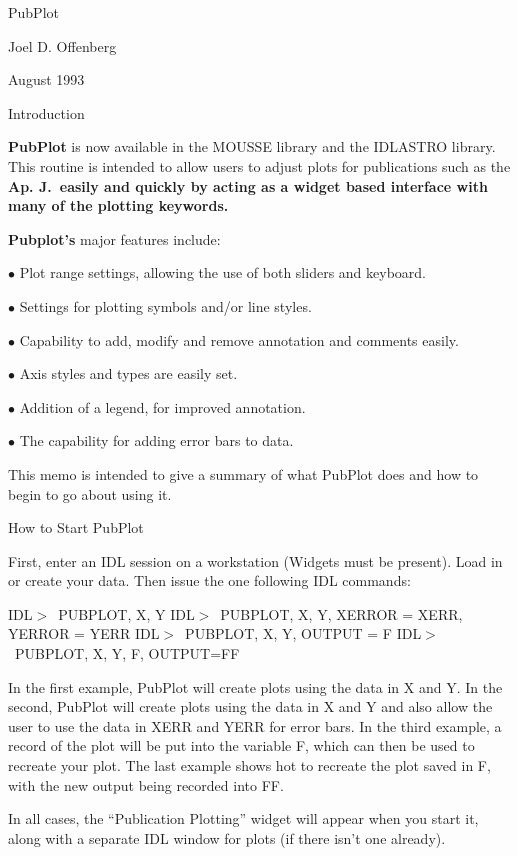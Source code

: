 \rm
\def\apj {\underbar\bf Ap. J.}
\def\idl {\hfill\break IDL$>$}
\def\pubplot {\bf PubPlot \rm}

\centerline {\bflarge PubPlot}
\vskip 2mm \centerline {\rmtwelve Joel D. Offenberg}
\vskip 2mm \centerline { August 1993}

\vskip 5mm \centerline {\rmtwelve Introduction}


{\bf PubPlot} is now available in the MOUSSE library and the IDLASTRO library. 
This 
routine is intended to allow users to adjust plots for publications such as
the \apj\ easily
and quickly by acting as a widget based interface with many of the plotting
keywords.  

{\bf Pubplot's} major features include:
\item{$\bullet$} Plot range settings, allowing the use of both sliders
	and keyboard.
\item{$\bullet$} Settings for plotting symbols and/or line styles.
\item{$\bullet$} Capability to add, modify and remove annotation and comments
	easily.
\item{$\bullet$} Axis styles and types are easily set.
\item{$\bullet$} Addition of a legend, for improved annotation.
\item{$\bullet$} The capability for adding error bars to data.

This memo is intended to give a summary of what PubPlot does and how to 
begin to go about using it.  

\vskip 3mm \centerline{\rmtwelve How to Start \bftwelve PubPlot}
First, enter an IDL session on a workstation (Widgets must be 
present).  Load in 
or create your data.  Then issue the one following IDL commands:

\idl\ PUBPLOT, X, Y	
\idl\ PUBPLOT, X, Y, XERROR = XERR, YERROR = YERR 
\idl\ PUBPLOT, X, Y, OUTPUT = F	
\idl\ PUBPLOT, X, Y, F, OUTPUT=FF	

In the first example, PubPlot will create plots using the data in X and Y.  In
the second, PubPlot will create plots using the data in X and Y and also allow
the user to use the data in XERR and YERR for error bars.  In the third 
example, a record of the plot will be put into the variable F, which can then
be used to recreate your plot.  The last example shows hot to recreate the 
plot saved in F, with the new output being recorded into FF.

In all cases, the ``Publication Plotting'' widget will appear when you start it, along with
a separate IDL window for plots (if there isn't one already).

